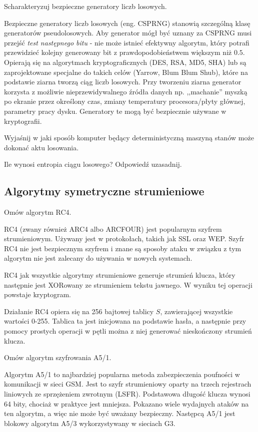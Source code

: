 \documentclass[answers,11pt]{exam}
\begin{document}
\begin{questions}
\question Scharakteryzuj bezpieczne generatory liczb losowych.
\begin{solution}
Bezpieczne generatory liczb losowych (eng. CSPRNG) stanowią szczególną klasę generatorów pseudolosowych. Aby generator mógł być uznany za CSPRNG musi przejść \textit{test następnego bitu} - nie może istnieć efektywny algorytm, który potrafi przewidzieć kolejny generowany bit z prawdopodobieństwem większym niż $0.5$. Opierają się na algorytmach kryptograficznych (DES, RSA, MD5, SHA) lub są zaprojektowane specjalne do takich celów (Yarrow, Blum Blum Shub), które na podstawie ziarna tworzą ciąg liczb losowych. Przy tworzeniu ziarna generator korzysta z możliwie nieprzewidywalnego źródła danych np. ,,machanie'' myszką po ekranie przez określony czas, zmiany temperatury procesora/płyty głównej, parametry pracy dysku. Generatory te mogą być bezpiecznie używane w kryptografii. 
\end{solution}


\question Wyjaśnij w jaki sposób komputer będący deterministyczną maszyną stanów może dokonać aktu losowania.

\question Ile wynosi entropia ciągu losowego? Odpowiedź uzasadnij.


\end{questions}

\subsection{Algorytmy symetryczne strumieniowe}
\begin{questions}

\question Omów algorytm RC4.
\begin{solution}
RC4 (zwany również ARC4 albo ARCFOUR) jest popularnym szyfrem strumieniowym. Używany jest w protokołach, takich jak SSL oraz WEP. Szyfr RC4 nie jest bezpiecznym szyfrem i znane są sposoby ataku w związku z tym algorytm nie jest zalecany do używania w nowych systemach.

RC4 jak wszystkie algorytmy strumieniowe generuje strumień klucza, który następnie jest XORowany ze strumieniem tekstu jawnego. W wyniku tej operacji powstaje kryptogram.

Działanie RC4 opiera się na 256 bajtowej tablicy $S$, zawierającej wszystkie wartości 0-255. Tablica ta jest inicjowana na podstawie hasła, a następnie przy pomocy prostych operacji w pętli można z niej generować nieskończony strumień klucza. 
\end{solution}

\question Omów algorytm szyfrowania A5/1.
\begin{solution}
Algorytm A5/1 to najbardziej popularna metoda zabezpieczenia poufności w komunikacji w sieci GSM. Jest to szyfr strumieniowy oparty na trzech rejestrach liniowych ze sprzężeniem zwrotnym (LSFR). Podstawowa długość klucza wynosi 64 bity, chociaż w praktyce jest mniejsza. Pokazano wiele wydajnych ataków na ten algorytm, a więc nie może być uważany bezpieczny. Następcą A5/1 jest blokowy algorytm A5/3 wykorzystywany w sieciach G3.
\end{solution}

\end{questions}
\end{document}
